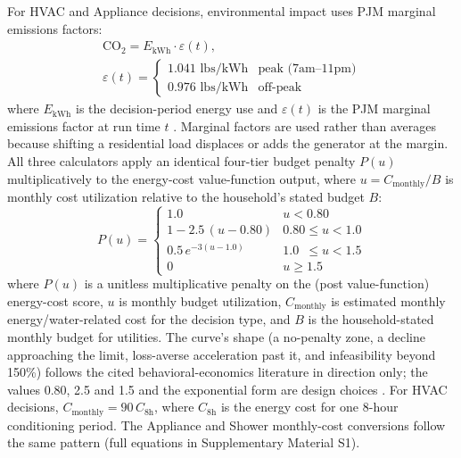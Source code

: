 \documentclass[final,3p,times]{elsarticle}
\begin{document}
For HVAC and Appliance decisions, environmental impact uses PJM marginal emissions factors:
\begin{equation}
\begin{gathered}
  \mathrm{CO_2} = E_{\mathrm{kWh}} \cdot \varepsilon(t), \\[4pt]
  \varepsilon(t) = \begin{cases}
    1.041 \text{ lbs/kWh} & \text{peak (7am--11pm)} \\
    0.976 \text{ lbs/kWh} & \text{off-peak}
  \end{cases}
\end{gathered}
  \label{eq:emissions}
\end{equation}
\noindent where $E_{\mathrm{kWh}}$ is the decision-period energy use and $\varepsilon(t)$ is the PJM marginal emissions factor at run time $t$ \cite{pjm2022emissions}. Marginal factors are used rather than averages because shifting a residential load displaces or adds the generator at the margin.
All three calculators apply an identical four-tier budget penalty $P(u)$ multiplicatively to the energy-cost value-function output, where $u = C_{\mathrm{monthly}} / B$ is monthly cost utilization relative to the household's stated budget $B$:
\begin{equation}
  P(u) = \begin{cases}
    1.0                          & u < 0.80                   \\[4pt]
    1 - 2.5\,(u - 0.80)         & 0.80 \le u < 1.0           \\[4pt]
    0.5\,e^{-3(u - 1.0)}        & 1.0 \phantom{0}\le u < 1.5 \\[4pt]
    0                            & u \ge 1.5
  \end{cases}
  \label{eq:budget_penalty}
\end{equation}
\noindent where $P(u)$ is a unitless multiplicative penalty on the (post value-function) energy-cost score, $u$ is monthly budget utilization, $C_{\mathrm{monthly}}$ is estimated monthly energy/water-related cost for the decision type, and $B$ is the household-stated monthly budget for utilities.
\noindent The curve's shape (a no-penalty zone, a decline approaching the limit, loss-averse acceleration past it, and infeasibility beyond 150\%) follows the cited behavioral-economics literature in direction only; the values 0.80, 2.5 and 1.5 and the exponential form are design choices \cite{thaler1999,heath1996,prelec1998,gathergood2012}. For HVAC decisions, $C_{\mathrm{monthly}} = 90\,C_{\mathrm{8h}}$, where $C_{\mathrm{8h}}$ is the energy cost for one 8-hour conditioning period. The Appliance and Shower monthly-cost conversions follow the same pattern (full equations in Supplementary Material S1).
\end{document}

